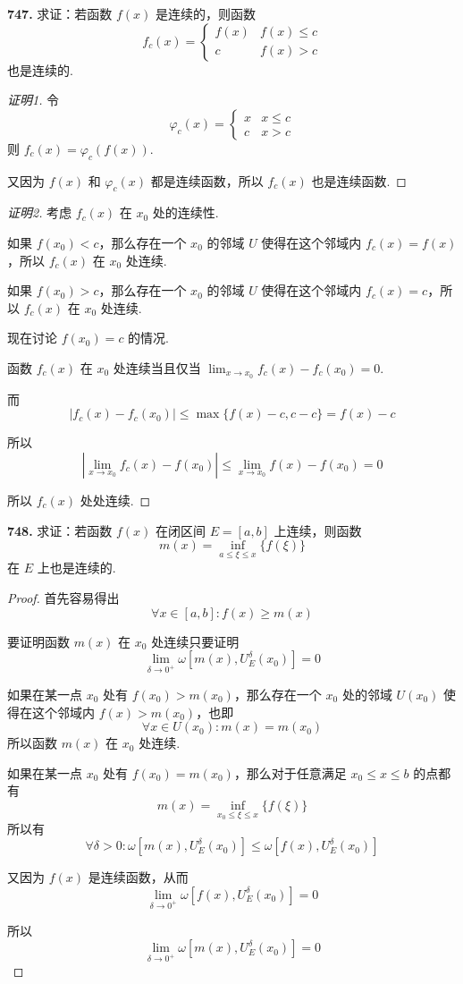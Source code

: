 \textbf{747.} 求证：若函数 $f(x)$ 是连续的，则函数
\[f_c(x) = \begin{cases}
    f(x) & f(x) \leqslant c\\
    c & f(x) > c
\end{cases}\]
也是连续的.
\begin{proof}[证明1]
    令
    \[\varphi_c(x) = \begin{cases}
        x & x \leqslant c\\
        c & x > c
    \end{cases}\]
    则 $f_c(x) = \varphi_c(f(x))$.

    又因为 $f(x)$ 和 $\varphi_c(x)$ 都是连续函数，所以 $f_c(x)$ 也是连续函数.
\end{proof}
\begin{proof}[证明2]
    考虑 $f_c(x)$ 在 $x_0$ 处的连续性.

    如果 $f(x_0) < c$，那么存在一个 $x_0$ 的邻域 $U$ 使得在这个邻域内 $f_c(x) = f(x)$，所以 $f_c(x)$ 在 $x_0$ 处连续.

    如果 $f(x_0) > c$，那么存在一个 $x_0$ 的邻域 $U$ 使得在这个邻域内 $f_c(x) = c$，所以 $f_c(x)$ 在 $x_0$ 处连续.

    现在讨论 $f(x_0) = c$ 的情况.

    函数 $f_c(x)$ 在 $x_0$ 处连续当且仅当 $\displaystyle \lim_{x \rightarrow x_0} f_c(x) - f_c(x_0) = 0$.

    而
    \[\lvert f_c(x) - f_c(x_0)\rvert \leqslant \max\{f(x) - c, c - c\} = f(x) - c\]

    所以
    \[\left|\lim_{x \rightarrow x_0} f_c(x) - f(x_0)\right| \leqslant \lim_{x \rightarrow x_0} f(x) - f(x_0) = 0\]

    所以 $f_c(x)$ 处处连续.
\end{proof}\vspace{9pt}

\textbf{748.} 求证：若函数 $f(x)$ 在闭区间 $E = [a,b]$ 上连续，则函数
\[m(x) = \inf_{a \leqslant \xi \leqslant x} \{f(\xi)\}\]
在 $E$ 上也是连续的.

\begin{proof}
    首先容易得出
    \[\forall x \in [a,b]: f(x) \geqslant m(x)\]

    要证明函数 $m(x)$ 在 $x_0$ 处连续只要证明
    \[\lim_{\delta \rightarrow 0^+} \omega[m(x), U_E^\delta(x_0)] = 0\]

    如果在某一点 $x_0$ 处有 $f(x_0) > m(x_0)$，那么存在一个 $x_0$ 处的邻域 $U(x_0)$ 使得在这个邻域内 $f(x) > m(x_0)$，也即
    \[\forall x \in U(x_0): m(x) = m(x_0)\]
    所以函数 $m(x)$ 在 $x_0$ 处连续.

    如果在某一点 $x_0$ 处有 $f(x_0) = m(x_0)$，那么对于任意满足 $x_0 \leqslant x \leqslant b$ 的点都有
    \[m(x) = \inf_{x_0 \leqslant \xi \leqslant x} \{f(\xi)\}\]
    所以有
    \[\forall \delta > 0: \omega[m(x), U_E^\delta(x_0)] \leqslant \omega[f(x), U_E^\delta(x_0)]\]

    又因为 $f(x)$ 是连续函数，从而
    \[\lim_{\delta \rightarrow 0^+} \omega[f(x), U_E^\delta(x_0)] = 0\]

    所以
    \[\lim_{\delta \rightarrow 0^+} \omega[m(x), U_E^\delta(x_0)] = 0\]
\end{proof}\vspace{9pt}

